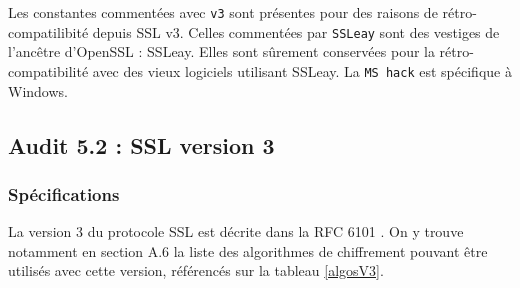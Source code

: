 Les constantes commentées avec \verb+v3+ sont présentes pour des raisons de rétro-compatilibité depuis SSL v3. Celles commentées par \verb+SSLeay+ sont des vestiges de l'ancêtre d'OpenSSL : SSLeay. Elles sont sûrement conservées pour la rétro-compatibilité avec des vieux logiciels utilisant SSLeay. La \verb+MS hack+ est spécifique à Windows.


\subsection{Audit 5.2 : SSL version 3}
\subsubsection{Spécifications}
La version 3 du protocole SSL est décrite dans la RFC 6101 \cite{rfc6101}. On y trouve notamment en section A.6 la liste des algorithmes de chiffrement pouvant être utilisés avec cette version, référencés sur la tableau \ref{algosV3}.

